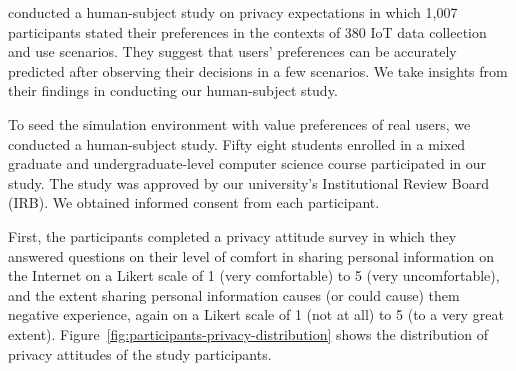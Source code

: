 \citet{Naeini-SOUPS2017-PrivacyExpectations+IOT} conducted a human-subject study on privacy expectations in which 1,007 participants stated their preferences in the contexts of 380 IoT data collection and use scenarios. They suggest that users' preferences can be accurately predicted after observing their decisions in a few scenarios. We take insights from their findings in conducting our human-subject study. 

To seed the simulation environment with value preferences of real users, we conducted a human-subject study. Fifty eight students enrolled in a mixed graduate and undergraduate-level computer science course participated in our study. The study was approved by our university's Institutional Review Board (IRB). We obtained informed consent from each participant. 

First, the participants completed a privacy attitude survey \citep{schnorf2014comparison} in which they answered questions on their level of comfort in sharing personal information on the Internet on a Likert scale of 1 (very comfortable) to 5 (very uncomfortable), and the extent sharing personal information causes (or could cause) them negative experience, again on a Likert scale of 1 (not at all) to 5 (to a very great extent). Figure~\ref{fig:participants-privacy-distribution} shows the distribution of privacy attitudes of the study participants. 

    
 
